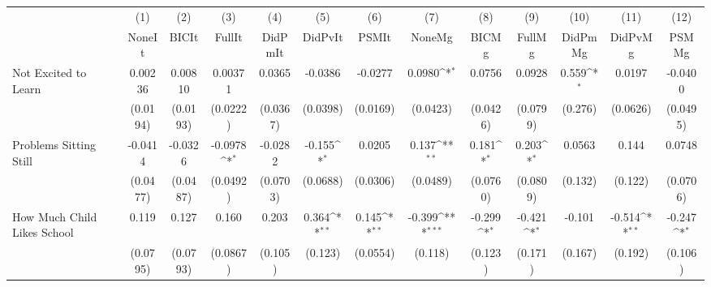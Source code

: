 {
\def\sym#1{\ifmmode^{#1}\else\(^{#1}\)\fi}
\begin{tabular}{l*{12}{c}}
\toprule
            &\multicolumn{1}{c}{(1)}&\multicolumn{1}{c}{(2)}&\multicolumn{1}{c}{(3)}&\multicolumn{1}{c}{(4)}&\multicolumn{1}{c}{(5)}&\multicolumn{1}{c}{(6)}&\multicolumn{1}{c}{(7)}&\multicolumn{1}{c}{(8)}&\multicolumn{1}{c}{(9)}&\multicolumn{1}{c}{(10)}&\multicolumn{1}{c}{(11)}&\multicolumn{1}{c}{(12)}\\
            &\multicolumn{1}{c}{NoneIt}&\multicolumn{1}{c}{BICIt}&\multicolumn{1}{c}{FullIt}&\multicolumn{1}{c}{DidPmIt}&\multicolumn{1}{c}{DidPvIt}&\multicolumn{1}{c}{PSMIt}&\multicolumn{1}{c}{NoneMg}&\multicolumn{1}{c}{BICMg}&\multicolumn{1}{c}{FullMg}&\multicolumn{1}{c}{DidPmMg}&\multicolumn{1}{c}{DidPvMg}&\multicolumn{1}{c}{PSMMg}\\
\midrule
Not Excited to Learn&     0.00236         &     0.00810         &     0.00371         &      0.0365         &     -0.0386         &     -0.0277         &      0.0980\sym{*}  &      0.0756         &      0.0928         &       0.559\sym{*}  &      0.0197         &     -0.0400         \\
            &    (0.0194)         &    (0.0193)         &    (0.0222)         &    (0.0367)         &    (0.0398)         &    (0.0169)         &    (0.0423)         &    (0.0426)         &    (0.0799)         &     (0.276)         &    (0.0626)         &    (0.0495)         \\
\addlinespace
Problems Sitting Still&     -0.0414         &     -0.0326         &     -0.0978\sym{*}  &     -0.0282         &      -0.155\sym{*}  &      0.0205         &       0.137\sym{**} &       0.181\sym{*}  &       0.203\sym{*}  &      0.0563         &       0.144         &      0.0748         \\
            &    (0.0477)         &    (0.0487)         &    (0.0492)         &    (0.0703)         &    (0.0688)         &    (0.0306)         &    (0.0489)         &    (0.0760)         &    (0.0809)         &     (0.132)         &     (0.122)         &    (0.0706)         \\
\addlinespace
How Much Child Likes School&       0.119         &       0.127         &       0.160         &       0.203         &       0.364\sym{**} &       0.145\sym{**} &      -0.399\sym{***}&      -0.299\sym{*}  &      -0.421\sym{*}  &      -0.101         &      -0.514\sym{**} &      -0.247\sym{*}  \\
            &    (0.0795)         &    (0.0793)         &    (0.0867)         &     (0.105)         &     (0.123)         &    (0.0554)         &     (0.118)         &     (0.123)         &     (0.171)         &     (0.167)         &     (0.192)         &     (0.106)         \\

\end{tabular}}
